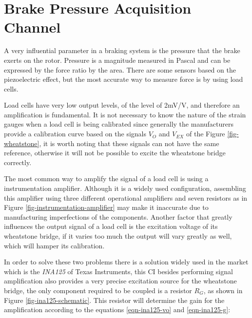 \section{Brake Pressure Acquisition Channel}

	A very influential parameter in a braking system is the pressure that the brake exerts on the rotor. Pressure is a magnitude measured in Pascal and can be expressed by the force ratio by the area. There are some sensors based on the piezoelectric effect, but the most accurate way to measure force is by using load cells.

	Load cells have very low output levels, of the level of 2mV/V, and therefore an amplification is fundamental. It is not necessary to know the nature of the strain gauges when a load cell is being calibrated since generally the manufacturers provide a calibration curve based on the signals $V_{O}$ and $V_{EX}$ of the Figure \ref{fig-wheatstone}, it is worth noting that these signals can not have the same reference, otherwise it will not be possible to excite the wheatstone bridge correctly. 

	The most common way to amplify the signal of a load cell is using a instrumentation amplifier. Although it is a widely used configuration, assembling this amplifier using three different operational amplifiers and seven resistors as in Figure \ref{fig-instrumentation-amplifier} may make it inaccurate due to manufacturing imperfections of the components. Another factor that greatly influences the output signal of a load cell is the excitation voltage of its wheatstone bridge, if it varies too much the output will vary greatly as well, which will hamper its calibration.
		
	In order to solve these two problems there is a solution widely used in the market which is the \textit{INA125} of Texas Instruments, this CI besides performing signal amplification also provides a very precise excitation source for the wheatstone bridge, the only component required to be coupled is a resistor $R_{G}$, as shown in Figure \ref{fig-ina125-schematic}. This resistor will determine the gain for the amplification according to the equations \ref{eqn-ina125-vo} and \ref{eqn-ina125-g}:
	

